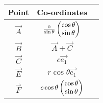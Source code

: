 \begin{tabular}{|c|c|c|}
\hline
Point & Co-ordinates\\
\hline
$\vec{A}$ & $\frac{b}{\sin{\theta}}\begin{pmatrix}\cos{\theta}\\\sin{\theta}\end{pmatrix}$\\
\hline
$\vec{B}$ & $\vec{A} + \vec{C}$\\
\hline
$\vec{C}$ & $c\vec{e_1}$\\
\hline
$\vec{E}$ & $r\cos{\theta}\vec{e_1}$\\
\hline
$\vec{F}$ & $c\cos{\theta}\begin{pmatrix}\cos{\theta}\\\sin{\theta}\end{pmatrix}$\\
\hline
\end{tabular}
